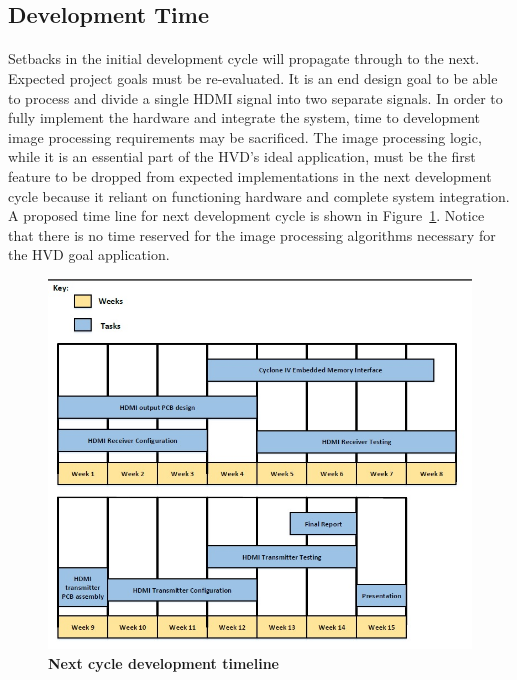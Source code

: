 \documentclass[pdftex,12pt,a4paper]{article}
\begin{document}
\subsection{Development Time}

\paragraph{}
Setbacks in the initial development cycle will propagate through to the next. Expected project goals must be re-evaluated. It is an end design goal to be able to process and divide a single HDMI signal into two separate signals. In order to fully implement the hardware and integrate the system, time to development image processing requirements may be sacrificed. The image processing logic, while it is an essential part of the HVD's ideal application, must be the first feature to be dropped from expected implementations in the next development cycle because it reliant on functioning hardware and complete system integration. A proposed time line for next development cycle is shown in Figure~\ref{fig:newtime}. Notice that there is no time reserved for the image processing algorithms necessary for the HVD goal application.

\begin{figure}[H]
\centering
\includegraphics[width=\textwidth]{timeline_spring.jpg}
\caption{\textbf{Next cycle development timeline}}
\label{fig:newtime}
\end{figure}
\end{document}
